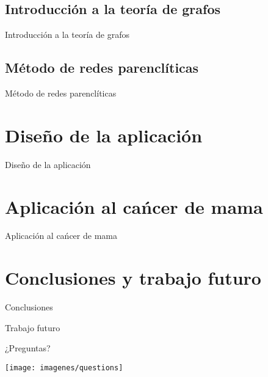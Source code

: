 \documentclass{beamer}
\begin{document}
\subsection{Introducción a la teoría de grafos}
\begin{frame}{Introducción a la teoría de grafos}
	
\end{frame}

\subsection{Método de redes parenclíticas}
\begin{frame}{Método de redes parenclíticas}
	
\end{frame}

\section{Diseño de la aplicación}
\begin{frame}{Diseño de la aplicación}
	
\end{frame}

\section{Aplicación al cańcer de mama}
\begin{frame}{Aplicación al cańcer de mama}
	
\end{frame}

\section{Conclusiones y trabajo futuro}
\begin{frame}{Conclusiones}
	
\end{frame}

\begin{frame}{Trabajo futuro}
	
\end{frame}

\begin{frame}{¿Preguntas?}
	
	{%
		\centering
		\texttt{[image: imagenes/questions]}
	}


\end{frame}
\end{document}
